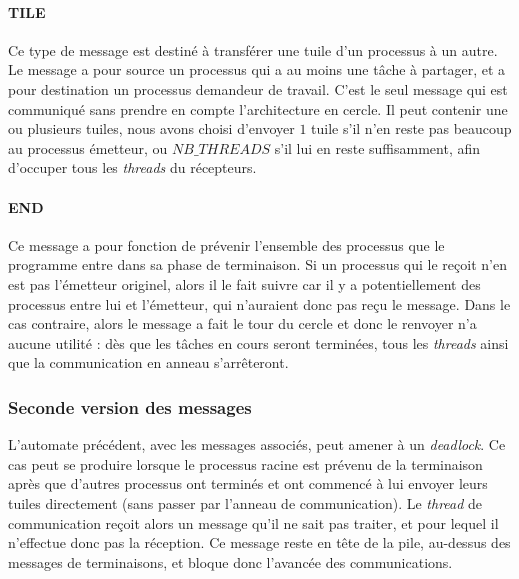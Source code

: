 \paragraph{TILE}
Ce type de message est destiné à transférer une tuile d'un processus à un autre. Le message a pour source un processus qui a au moins une tâche à partager, et a pour destination un processus demandeur de travail. C'est le seul message qui est communiqué sans prendre en compte l'architecture en cercle. Il peut contenir une ou plusieurs tuiles, nous avons choisi d'envoyer $1$ tuile s'il n'en reste pas beaucoup au processus émetteur, ou $NB\_THREADS$ s'il lui en reste suffisamment, afin d'occuper tous les \emph{threads} du récepteurs.

\paragraph{END}
Ce message a pour fonction de prévenir l'ensemble des processus que le programme entre dans sa phase de terminaison. Si un processus qui le reçoit n'en est pas l'émetteur originel, alors il le fait suivre car il y a potentiellement des processus entre lui et l'émetteur, qui n'auraient donc pas reçu le message. Dans le cas contraire, alors le message a fait le tour du cercle et donc le renvoyer n'a aucune utilité : dès que les tâches en cours seront terminées, tous les \emph{threads} ainsi que la communication en anneau s'arrêteront.

\subsubsection*{Seconde version des messages}

L'automate précédent, avec les messages associés, peut amener à un \emph{deadlock}. Ce cas peut se produire lorsque le processus racine est prévenu de la terminaison après que d'autres processus ont terminés et ont commencé à lui envoyer leurs tuiles directement (sans passer par l'anneau de communication). Le \emph{thread} de communication reçoit alors un message qu'il ne sait pas traiter, et pour lequel il n'effectue donc pas la réception. Ce message reste en tête de la pile, au-dessus des messages de terminaisons, et bloque donc l'avancée des communications. 


